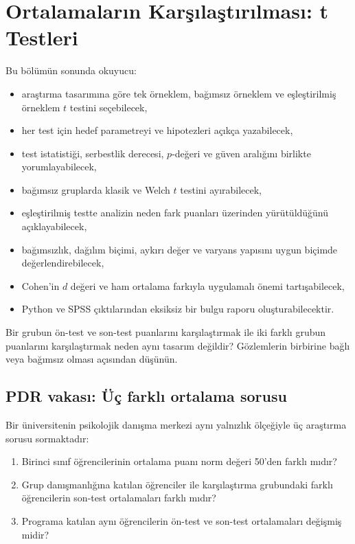 \chapter{Ortalamaların Karşılaştırılması: t Testleri}
\label{ch:power-one-sample}
\label{ch:two-sample}

\begin{hedefler}
Bu bölümün sonunda okuyucu:
\begin{itemize}
  \item araştırma tasarımına göre tek örneklem, bağımsız örneklem ve eşleştirilmiş örneklem $t$ testini seçebilecek,
  \item her test için hedef parametreyi ve hipotezleri açıkça yazabilecek,
  \item test istatistiği, serbestlik derecesi, $p$-değeri ve güven aralığını birlikte yorumlayabilecek,
  \item bağımsız gruplarda klasik ve Welch $t$ testini ayırabilecek,
  \item eşleştirilmiş testte analizin neden fark puanları üzerinden yürütüldüğünü açıklayabilecek,
  \item bağımsızlık, dağılım biçimi, aykırı değer ve varyans yapısını uygun biçimde değerlendirebilecek,
  \item Cohen'in $d$ değeri ve ham ortalama farkıyla uygulamalı önemi tartışabilecek,
  \item Python ve SPSS çıktılarından eksiksiz bir bulgu raporu oluşturabilecektir.
\end{itemize}
\end{hedefler}

\begin{hazirlik}
Bir grubun ön-test ve son-test puanlarını karşılaştırmak ile iki farklı grubun
puanlarını karşılaştırmak neden aynı tasarım değildir? Gözlemlerin birbirine
bağlı veya bağımsız olması açısından düşünün.
\end{hazirlik}

\section{PDR vakası: Üç farklı ortalama sorusu}

Bir üniversitenin psikolojik danışma merkezi aynı yalnızlık ölçeğiyle üç
araştırma sorusu sormaktadır:

\begin{enumerate}
  \item Birinci sınıf öğrencilerinin ortalama puanı norm değeri 50'den farklı mıdır?
  \item Grup danışmanlığına katılan öğrenciler ile karşılaştırma grubundaki farklı öğrencilerin son-test ortalamaları farklı mıdır?
  \item Programa katılan aynı öğrencilerin ön-test ve son-test ortalamaları değişmiş midir?
\end{enumerate}


